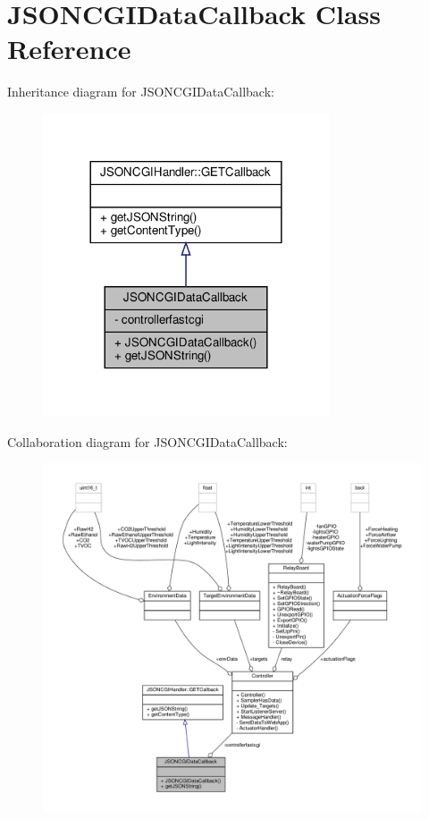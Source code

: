 \hypertarget{classJSONCGIDataCallback}{}\section{J\+S\+O\+N\+C\+G\+I\+Data\+Callback Class Reference}
\label{classJSONCGIDataCallback}


Inheritance diagram for J\+S\+O\+N\+C\+G\+I\+Data\+Callback\+:\nopagebreak
\begin{figure}[H]
\begin{center}
\leavevmode
\includegraphics[width=240pt]{classJSONCGIDataCallback__inherit__graph}
\end{center}
\end{figure}


Collaboration diagram for J\+S\+O\+N\+C\+G\+I\+Data\+Callback\+:\nopagebreak
\begin{figure}[H]
\begin{center}
\leavevmode
\includegraphics[width=350pt]{classJSONCGIDataCallback__coll__graph}
\end{center}
\end{figure}
